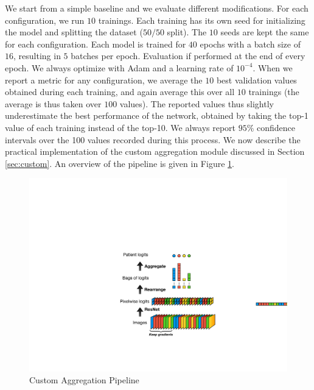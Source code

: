 \documentclass[final]{cvpr}
\begin{document}
	We start from a simple baseline and we evaluate different modifications.
	For each configuration, we run $10$ trainings. Each training has its own seed for initializing the model and splitting the dataset ($50/50$ split). The $10$ seeds are kept the same for each configuration. Each model is trained for $40$ epochs with a batch size of $16$, resulting in $5$ batches per epoch. Evaluation if performed at the end of every epoch. We always optimize with Adam and a learning rate of $10^{-4}$. When we report a metric for any configuration, we average the $10$ best validation values obtained during each training, and again average this over all $10$ trainings (the average is thus taken over $100$ values). The reported values thus slightly underestimate the best performance of the network, obtained by taking the top-1 value of each training instead of the top-10. We always report $95\%$ confidence intervals over the 100 values recorded during this process.
	We now describe the practical implementation of the custom aggregation module discussed in Section \ref{sec:custom}. An overview of the pipeline is given in Figure \ref{fig:overview}.
	
	\vspace{2mm}
	
	\begin{figure}[h!]
		\begin{center}
			\includegraphics[width=0.98\linewidth]{fig/graphic3.pdf}
		\end{center}
		\caption{Custom Aggregation Pipeline}
		\label{fig:overview}
	\end{figure}
	
\end{document}
